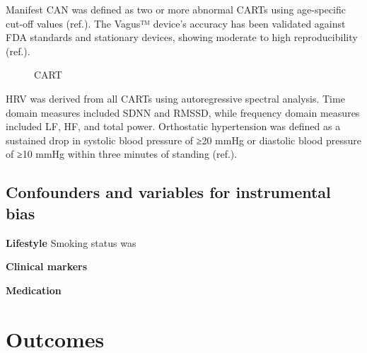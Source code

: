 \documentclass[
  a4paper,
  headsepline=true,
  open=any]{scrbook}
\begin{document}
Manifest CAN was defined as two or more abnormal CARTs using
age-specific cut-off values (ref.). The Vagus™ device's accuracy has
been validated against FDA standards and stationary devices, showing
moderate to high reproducibility (ref.).

\begin{figure}

\begin{minipage}[t]{\linewidth}

{\centering 


\caption{CART}

}

\end{minipage}%

\end{figure}

HRV was derived from all CARTs using autoregressive spectral analysis.
Time domain measures included SDNN and RMSSD, while frequency domain
measures included LF, HF, and total power. Orthostatic hypertension was
defined as a sustained drop in systolic blood pressure of ≥20 mmHg or
diastolic blood pressure of ≥10 mmHg within three minutes of standing
(ref.).

\hypertarget{confounders-and-variables-for-instrumental-bias}{%
\subsection{Confounders and variables for instrumental
bias}\label{confounders-and-variables-for-instrumental-bias}}

\textbf{Lifestyle} Smoking status was

\textbf{Clinical markers}

\textbf{Medication}

\hypertarget{outcomes}{%
\section{Outcomes}\label{outcomes}}
\end{document}
